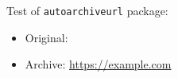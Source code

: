 \documentclass{article}
\begin{document}
Test of \texttt{autoarchiveurl} package:

\begin{itemize}
  \item Original: 
  \item Archive:  \url{https://example.com}
\end{itemize}
\end{document}
